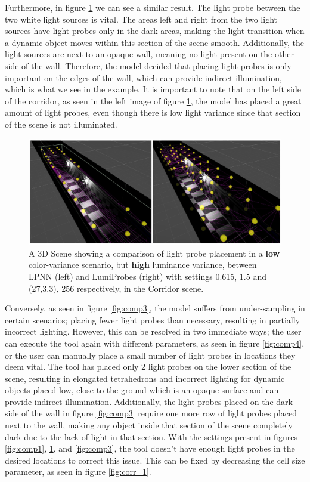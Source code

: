 Furthermore, in figure \ref{fig:comp2} we can see a similar result. The light probe between the two white light sources is vital. The areas left and right from the two light sources have light probes only in the dark areas, making the light transition when a dynamic object moves within this section of the scene smooth. Additionally, the light sources are next to an opaque wall, meaning no light present on the other side of the wall. Therefore, the model decided that placing light probes is only important on the edges of the wall, which can provide indirect illumination, which is what we see in the example. It is important to note that on the left side of the corridor, as seen in the left image of figure \ref{fig:comp2}, the model has placed a great amount of light probes, even though there is low light variance since that section of the scene is not illuminated. 

\begin{figure}[h]
	\centering
	\includegraphics[width=\linewidth]{Graphics/results/concats/comparison2.png}
	\caption{A 3D Scene showing a comparison of light probe placement in a \textbf{low} color-variance scenario, but \textbf{high} luminance variance, between LPNN (left) and LumiProbes (right) with settings 0.615, 1.5 and (27,3,3), 256 respectively, in the Corridor scene.}
	\label{fig:comp2}
\end{figure}

Conversely, as seen in figure \ref{fig:comp3}, the model suffers from under-sampling in certain scenarios; placing fewer light probes than necessary, resulting in partially incorrect lighting. However, this can be resolved in two immediate ways; the user can execute the tool again with different parameters, as seen in figure \ref{fig:comp4}, or the user can manually place a small number of light probes in locations they deem vital. The tool has placed only 2 light probes on the lower section of the scene, resulting in elongated tetrahedrons and incorrect lighting for dynamic objects placed low, close to the ground which is an opaque surface and can provide indirect illumination. Additionally, the light probes placed on the dark side of the wall in figure \ref{fig:comp3} require one more row of light probes placed next to the wall, making any object inside that section of the scene completely dark due to the lack of light in that section. With the settings present in figures \ref{fig:comp1}, \ref{fig:comp2}, and \ref{fig:comp3}, the tool doesn't have enough light probes in the desired locations to correct this issue. This can be fixed by decreasing the cell size parameter, as seen in figure \ref{fig:corr_1}.

